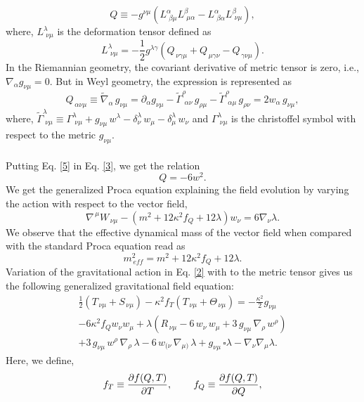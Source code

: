 \begin{equation}
\label{3}
Q\equiv- g^{\nu \mu}\left(L^\alpha_{\,\,\beta\mu}L^\beta_{\,\,\mu\alpha}-L^\alpha_{\,\,\beta\alpha}L^\beta_{\,\,\nu \mu}\right),
\end{equation}
where, $L^\lambda_{\,\,\nu \mu}$ is the deformation tensor defined as
\begin{equation}
\label{4}
L^\lambda_{\,\,\nu \mu}=-\frac{1}{2}g^{\lambda\gamma}\left(Q_{\,\nu\gamma\mu}+Q_{\,\mu\gamma\nu}-Q_{\,\gamma\nu\mu}\right).
\end{equation}
In the Riemannian geometry, the covariant derivative of metric tensor is zero, i.e., $\nabla_\alpha g_{\nu\mu}=0$. But in Weyl geometry, the expression is represented as \cite{Haghani/2012}  
\begin{equation}
\label{5}
Q_{\,\alpha\nu\mu}\equiv\widetilde{\nabla}_\alpha \,g_{\nu\mu}=\partial_\alpha g_{\nu\mu}-\widetilde{\Gamma}^\rho_{\,\,\alpha\nu}\,g_{\rho\mu}-\widetilde{\Gamma}^\rho_{\,\,\alpha\mu}\,g_{\rho\nu}=2w_\alpha\,g_{\nu\mu},
\end{equation}
where, $\widetilde{\Gamma}^\lambda_{\,\,\nu\mu}\equiv\Gamma^\lambda_{\,\,\nu\mu}+g_{\nu\mu}\,w^\lambda-\delta^\lambda_\nu\, w_\mu-\delta^\lambda_\mu\, w_\nu$ and $\Gamma^\lambda_{\,\,\nu\mu}$ is the christoffel symbol with respect to the metric $g_{\nu\mu}$.\\\\
Putting Eq. \eqref{5} in Eq. \eqref{3}, we get the relation 
\begin{equation}
\label{6}
Q=-6w^2 .
\end{equation}
We get the generalized Proca equation explaining the field evolution by varying the action with respect to the vector field,
\begin{equation}
\label{7}
\nabla^{\,\mu} W_{\,\nu\mu}-\left(m^2+12\kappa^2f_Q+12\lambda\right)w_\nu=6\nabla_\nu \lambda .
\end{equation}
We observe that the effective dynamical mass of the vector field when compared with the standard Proca equation read as
\begin{equation}
\label{8}
m^2_{\,eff}=m^2+12\kappa^2f_Q+12\lambda .
\end{equation}
Variation of the gravitational action in Eq. \ref{2} with to the metric tensor gives us the following generalized gravitational field equation:
\begin{multline}
\label{9}
\frac{1}{2}\left(T_{\,\nu\mu}+S_{\,\nu\mu}\right)-\kappa^2 f_{T}\left(T_{\,\nu\mu}+\Theta_{\,\nu\mu}\right)=-\frac{\kappa^2}{2}g_{\nu\mu} \\
-6 \kappa^2f_Q w_\nu w_\mu + \lambda\left(R_{\,\nu\mu}-6\,w_\nu \,w_\mu +3\,g_{\nu\mu}\,\nabla_\rho \,w^\rho \right) \\
+3\,g_{\nu\mu}\,w^\rho \,\nabla_\rho \,\lambda -6\,w_{(\nu}\,\nabla_{\mu )}\,\lambda
+g_{\nu\mu}\,\square \lambda-\nabla_\nu\nabla_\mu \lambda.
\end{multline}
Here, we define,
\begin{equation}
\label{10}
f_T\equiv \frac{\partial f(Q,T)}{\partial T}, \hspace{0.3in}
f_Q\equiv\frac{\partial f(Q,T)}{\partial Q},
\end{equation}

